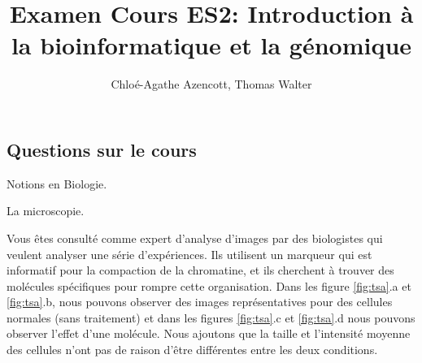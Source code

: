 \documentclass[11pt,addpoints]{exam}
\title{Examen Cours ES2: Introduction à la bioinformatique et la génomique}
\author{Chloé-Agathe Azencott, Thomas Walter}
\begin{document}
\maketitle 

\begin{questions}

\section{Questions sur le cours}

\question[2] Notions en Biologie. 

\question[1] La microscopie.

\question[3] Vous êtes consulté comme expert d'analyse d'images par
des biologistes qui veulent analyser une série d'expériences. Ils
utilisent un marqueur qui est informatif pour la compaction de la
chromatine, et ils cherchent à trouver des molécules spécifiques pour
rompre cette organisation. Dans les figure \ref{fig:tsa}.a et
\ref{fig:tsa}.b, nous pouvons observer des images représentatives pour
des cellules normales (sans traitement) et dans les figures
\ref{fig:tsa}.c et \ref{fig:tsa}.d nous pouvons observer l'effet d'une
molécule. Nous ajoutons que la taille et l'intensité moyenne des
cellules n'ont pas de raison d'être différentes entre les deux
conditions. 


\end{questions}
\end{document}
